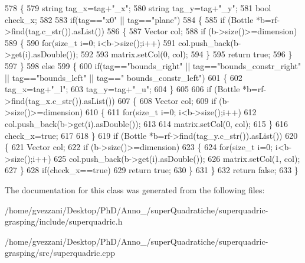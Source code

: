 \begin{DoxyCode}
578 \{
579    \textcolor{keywordtype}{string} tag\_x=tag+\textcolor{stringliteral}{"\_x"};
580    \textcolor{keywordtype}{string} tag\_y=tag+\textcolor{stringliteral}{"\_y"};
581    \textcolor{keywordtype}{bool} check\_x;
582 
583    \textcolor{keywordflow}{if}(tag==\textcolor{stringliteral}{"x0"} || tag==\textcolor{stringliteral}{"plane"})
584    \{
585        \textcolor{keywordflow}{if} (Bottle *b=rf->find(tag.c\_str()).asList())
586        \{
587            Vector col;
588            \textcolor{keywordflow}{if} (b->size()>=dimension)
589            \{
590                \textcolor{keywordflow}{for}(\textcolor{keywordtype}{size\_t} i=0; i<b->size();i++)
591                    col.push\_back(b->get(i).asDouble());
592 
593                matrix.setCol(0, col);
594            \}
595            \textcolor{keywordflow}{return} \textcolor{keyword}{true};
596        \}
597    \}
598    \textcolor{keywordflow}{else}
599    \{
600        \textcolor{keywordflow}{if}(tag==\textcolor{stringliteral}{"bounds\_right"} || tag==\textcolor{stringliteral}{"bounds\_constr\_right"} || tag==\textcolor{stringliteral}{"bounds\_left"} || tag==\textcolor{stringliteral}{"
      bounds\_constr\_left"})
601        \{
602            tag\_x=tag+\textcolor{stringliteral}{"\_l"};
603            tag\_y=tag+\textcolor{stringliteral}{"\_u"};
604        \}
605 
606        \textcolor{keywordflow}{if} (Bottle *b=rf->find(tag\_x.c\_str()).asList())
607        \{
608            Vector col;
609            \textcolor{keywordflow}{if} (b->size()>=dimension)
610            \{
611                \textcolor{keywordflow}{for}(\textcolor{keywordtype}{size\_t} i=0; i<b->size();i++)
612                    col.push\_back(b->get(i).asDouble());
613 
614                matrix.setCol(0, col);
615            \}
616            check\_x=\textcolor{keyword}{true};
617 
618        \}
619        \textcolor{keywordflow}{if} (Bottle *b=rf->find(tag\_y.c\_str()).asList())
620        \{
621            Vector col;
622            \textcolor{keywordflow}{if} (b->size()>=dimension)
623            \{
624                \textcolor{keywordflow}{for}(\textcolor{keywordtype}{size\_t} i=0; i<b->size();i++)
625                    col.push\_back(b->get(i).asDouble());
626                matrix.setCol(1, col);
627            \}
628            \textcolor{keywordflow}{if}(check\_x==\textcolor{keyword}{true})
629                \textcolor{keywordflow}{return} \textcolor{keyword}{true};
630        \}
631    \}
632 \textcolor{keywordflow}{return} \textcolor{keyword}{false};
633 \}
\end{DoxyCode}


The documentation for this class was generated from the following files\+:\begin{DoxyCompactItemize}
\item 
/home/gvezzani/\+Desktop/\+Ph\+D/\+Anno\+\_/super\+Quadratiche/superquadric-\/grasping/include/superquadric.\+h\item 
/home/gvezzani/\+Desktop/\+Ph\+D/\+Anno\+\_/super\+Quadratiche/superquadric-\/grasping/src/superquadric.\+cpp\end{DoxyCompactItemize}
